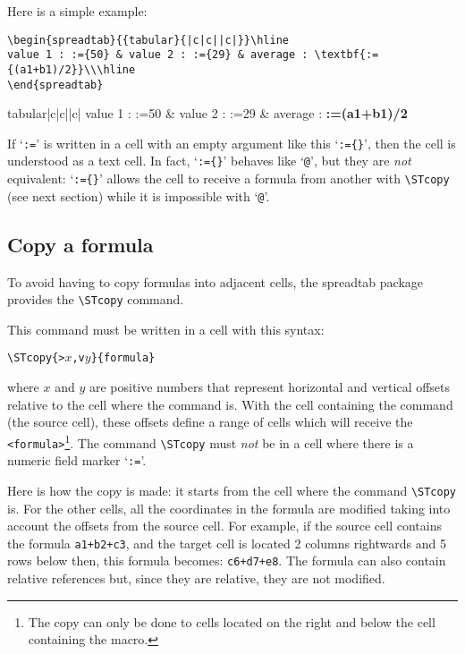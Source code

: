 \documentclass[a4paper,10pt]{article}
\newcommand\verbinline[1][]{\lstinline[breaklines=false,basicstyle=\normalsize\ttfamily,#1]}
\newcommand\ST{\textsf{spreadtab}\xspace}
\begin{document}
\begin{<table environment>}
Here is a simple example:\par\nobreak
\begin{lstlisting}
\begin{spreadtab}{{tabular}{|c|c||c|}}\hline
value 1 : :={50} & value 2 : :={29} & average : \textbf{:={(a1+b1)/2}}\\\hline
\end{spreadtab}
\end{lstlisting}
\begin{center}
\begin{spreadtab}{{tabular}{|c|c||c|}}\hline
value 1 : :={50} & value 2 : :={29} & average : \textbf{:={(a1+b1)/2}}\\\hline
\end{spreadtab}
\end{center}
If `\verb-:=-' is written in a cell with an empty argument like this `\verb-:={}-', then the cell is understood as a text cell. In fact, `\verb-:={}-' behaves like `\verb-@-', but they are \emph{not} equivalent: `\verb-:={}-' allows the cell to receive a formula from another with \verbinline-\STcopy- (see next section) while it is impossible with `\verb-@-'.

\subsection{Copy a formula}
To avoid having to copy formulas into adjacent cells, the \ST package provides the \verbinline-\STcopy- command.

This command must be written in a cell with this syntax:
\begin{center}
\verbinline-\STcopy{>-$x$\verbinline-,v-$y$\verbinline-}{formula}-
\end{center}
where $x$ and $y$ are positive numbers that represent horizontal and vertical offsets relative to the cell where the command is. With the cell containing the command (the source cell), these offsets define a range of cells which will receive the \verb-<formula>-\footnote{The copy can only be done to cells located on the right and below the cell containing the macro.}. The command \verbinline-\STcopy- must \emph{not} be in a cell where there is a numeric field marker `\verb-:=-'.

Here is how the copy is made: it starts from the cell where the command \verbinline-\STcopy- is. For the other cells,  all the coordinates in the formula are modified taking into account the offsets from the source cell. For example, if the source cell contains the formula \verb-a1+b2+c3-, and the target cell is located 2 columns rightwards and 5 rows below then, this formula becomes: \verb-c6+d7+e8-. The formula can also contain relative references but, since they are relative, they are not modified.


\end{<table environment>}
\end{document}
